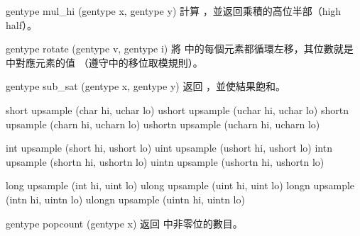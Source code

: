 gentype mul_hi (gentype x,
		gentype y)
\stopbuffer
{}
計算 ，並返回乘積的高位半部（high half）。
\stopbuffer

gentype rotate (gentype v, gentype i)
\stopbuffer
{}
將  中的每個元素都循環左移，其位數就是  中對應元素的值
（遵守中的移位取模規則）。
\stopbuffer

gentype sub_sat (gentype x, gentype y)
\stopbuffer
{}
返回 ，並使結果飽和。
\stopbuffer

short upsample (char hi, uchar lo)
ushort upsample (uchar hi, uchar lo)
shortn upsample (charn hi, ucharn lo)
ushortn upsample (ucharn hi, ucharn lo)
\stopbuffer
{}
\par
{}
\stopbuffer
{}
int upsample (short hi, ushort lo)
uint upsample (ushort hi, ushort lo)
intn upsample (shortn hi, ushortn lo)
uintn upsample (ushortn hi, ushortn lo)
\stopbuffer
{}
\par
{}
\stopbuffer
{}
long upsample (int hi, uint lo)
ulong upsample (uint hi, uint lo)
longn upsample (intn hi, uintn lo)
ulongn upsample (uintn hi, uintn lo)
\stopbuffer
{}
\par
{}
\stopbuffer

gentype popcount (gentype x)
\stopbuffer
{}
返回  中非零位的數目。
\stopbuffer

\startCLFD


\stopCLFD

